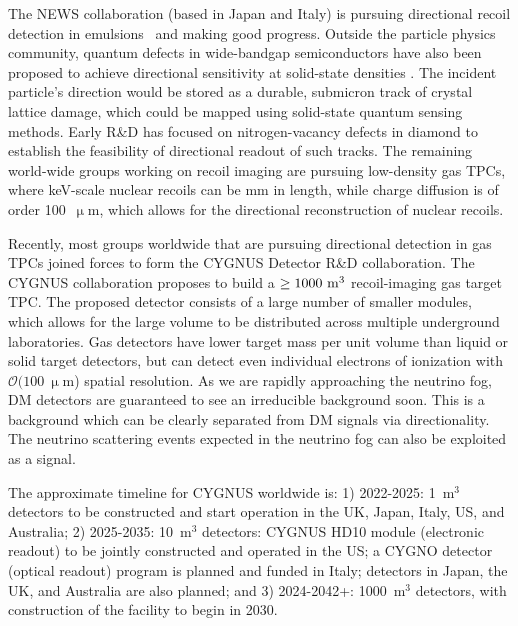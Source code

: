 The NEWS collaboration (based in Japan and Italy) is pursuing directional recoil detection in emulsions~\cite{NEWS:2016fyf} and making good progress.  Outside the particle physics community, quantum defects in wide-bandgap semiconductors have also been proposed to achieve directional sensitivity at solid-state densities \cite{Rajendran:2017ynw,Marshall:2020azl,Ebadi:2022}.  The incident particle's direction would be stored as a durable, submicron track of crystal lattice damage, which could be mapped using solid-state quantum sensing methods. Early R\&D has focused on nitrogen-vacancy defects in diamond \cite{Marshall:2020azl,Marshall:2021kjk,Marshall:2021xiu} to establish the feasibility of directional readout of such tracks. 
The remaining world-wide groups working on recoil imaging are pursuing low-density gas TPCs, where keV-scale nuclear recoils can be mm in length, while charge diffusion is of order 100~$\upmu$m, which allows for the directional reconstruction of nuclear recoils.

Recently, most groups worldwide that are pursuing directional detection in gas TPCs joined forces to form the CYGNUS Detector R\&D collaboration.  The CYGNUS collaboration proposes to build a $\ge 1000~{\rm m}^3$ recoil-imaging gas target TPC.  The proposed detector consists of a large number of smaller modules, which allows for the large volume to be distributed across multiple underground laboratories. Gas detectors have lower target mass per unit volume than liquid or solid target detectors, but can detect even individual electrons of ionization with $\mathcal{O}(100~\upmu$m) spatial resolution.  As we are rapidly approaching the neutrino fog, DM detectors are guaranteed to see an irreducible background soon. This is a background which can be clearly separated from DM signals via directionality. The neutrino scattering events expected in the neutrino fog can also be exploited as a signal.

The approximate timeline for CYGNUS worldwide is: 1) 2022-2025: 1~m$^3$ detectors to be constructed and start operation in the UK, Japan, Italy, US, and Australia; 2) 2025-2035: 10~m$^3$ detectors: CYGNUS HD10 module (electronic readout) to be jointly constructed and operated in the US; a CYGNO detector (optical readout) program is planned and funded in Italy; detectors in Japan, the UK, and Australia are also planned; and 3) 2024-2042+: 1000~m$^3$ detectors, with construction of the facility to begin in 2030.

